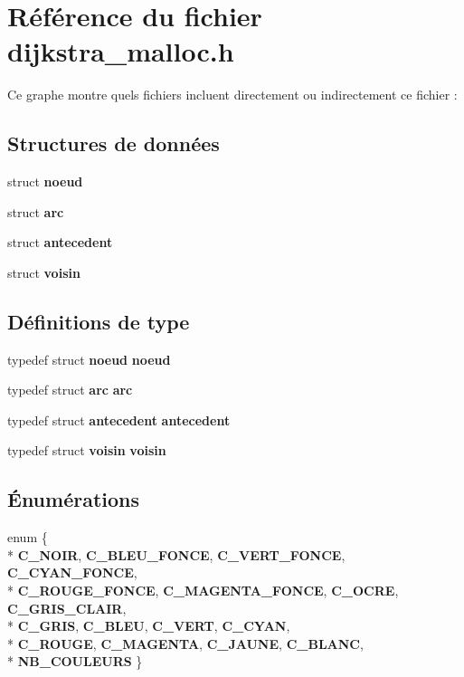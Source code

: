 \section{Référence du fichier dijkstra\+\_\+malloc.\+h}
\label{dijkstra__malloc_8h}
Ce graphe montre quels fichiers incluent directement ou indirectement ce fichier \+:
\subsection*{Structures de données}
\begin{DoxyCompactItemize}
\item 
struct {\bf noeud}
\item 
struct {\bf arc}
\item 
struct {\bf antecedent}
\item 
struct {\bf voisin}
\end{DoxyCompactItemize}
\subsection*{Définitions de type}
\begin{DoxyCompactItemize}
\item 
typedef struct {\bf noeud} {\bf noeud}
\item 
typedef struct {\bf arc} {\bf arc}
\item 
typedef struct {\bf antecedent} {\bf antecedent}
\item 
typedef struct {\bf voisin} {\bf voisin}
\end{DoxyCompactItemize}
\subsection*{Énumérations}
\begin{DoxyCompactItemize}
\item 
enum \{ \\*
{\bf C\+\_\+\+N\+O\+IR}, 
{\bf C\+\_\+\+B\+L\+E\+U\+\_\+\+F\+O\+N\+CE}, 
{\bf C\+\_\+\+V\+E\+R\+T\+\_\+\+F\+O\+N\+CE}, 
{\bf C\+\_\+\+C\+Y\+A\+N\+\_\+\+F\+O\+N\+CE}, 
\\*
{\bf C\+\_\+\+R\+O\+U\+G\+E\+\_\+\+F\+O\+N\+CE}, 
{\bf C\+\_\+\+M\+A\+G\+E\+N\+T\+A\+\_\+\+F\+O\+N\+CE}, 
{\bf C\+\_\+\+O\+C\+RE}, 
{\bf C\+\_\+\+G\+R\+I\+S\+\_\+\+C\+L\+A\+IR}, 
\\*
{\bf C\+\_\+\+G\+R\+IS}, 
{\bf C\+\_\+\+B\+L\+EU}, 
{\bf C\+\_\+\+V\+E\+RT}, 
{\bf C\+\_\+\+C\+Y\+AN}, 
\\*
{\bf C\+\_\+\+R\+O\+U\+GE}, 
{\bf C\+\_\+\+M\+A\+G\+E\+N\+TA}, 
{\bf C\+\_\+\+J\+A\+U\+NE}, 
{\bf C\+\_\+\+B\+L\+A\+NC}, 
\\*
{\bf N\+B\+\_\+\+C\+O\+U\+L\+E\+U\+RS}
 \}
\end{DoxyCompactItemize}
